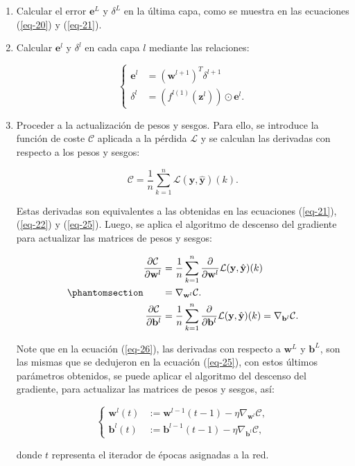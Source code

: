 \documentclass[
  us-letterpaper,
]{scrreprt}
\theoremstyle{plain}
\theoremstyle{definition}
\theoremstyle{definition}
\theoremstyle{plain}
\theoremstyle{remark}
\begin{document}
\begin{enumerate}
\def\labelenumi{\arabic{enumi}.}
\item
  Calcular el error \(\mathbf e^L\) y \(\delta^L\) en la última capa,
  como se muestra en las ecuaciones (\ref{eq-20}) y (\ref{eq-21}).
\item
  Calcular \(\mathbf e^l\) y \(\delta^l\) en cada capa \(l\) mediante
  las relaciones:

  \[
  \begin{cases}\mathbf e^l&= (\mathbf w^{l+1})^T\delta^{l+1}\\ \delta^l &= (f^{l(1)}(\mathbf z^l))\odot \mathbf e^l.\end{cases}
  \]
\item
  Proceder a la actualización de pesos y sesgos. Para ello, se introduce
  la función de coste \(\mathcal C\) aplicada a la pérdida
  \(\mathcal L\) y se calculan las derivadas con respecto a los pesos y
  sesgos:

  \[
  \mathcal C=\frac{1}{n}\sum_{k=1}^n \mathcal L(\mathbf y, \mathbf{\hat{y}})(k).
  \]

  Estas derivadas son equivalentes a las obtenidas en las ecuaciones
  (\ref{eq-21}), (\ref{eq-22}) y (\ref{eq-25}). Luego, se aplica el
  algoritmo de descenso del gradiente para actualizar las matrices de
  pesos y sesgos:

  \begin{equation}\phantomsection\label{eq-26}{
  \begin{split}\frac{\partial \mathcal C}{\partial \mathbf w^l}&=\frac{1}{n}\sum_{k=1}^n \frac{\partial}{\partial \mathbf w^l}\mathcal L(\mathbf y, \hat{\mathbf y})(k)\\ &=\nabla_{\mathbf w^l}\mathcal C.\\ 
  \frac{\partial\mathcal C}{\partial\mathbf b^l}&= \frac{1}{n}\sum_{k=1}^n \frac{\partial}{\partial \mathbf b^l}\mathcal L(\mathbf y, \hat{\mathbf y})(k)=\nabla_{\mathbf b^l}\mathcal C.\end{split}
  }\end{equation}

  Note que en la ecuación (\ref{eq-26}), las derivadas con respecto a
  \(\mathbf w^L\) y \(\mathbf b^L\), son las mismas que se dedujeron en
  la ecuación (\ref{eq-25}), con estos últimos parámetros obtenidos, se
  puede aplicar el algoritmo del descenso del gradiente, para actualizar
  las matrices de pesos y sesgos, así:

  \[
  \begin{cases}\mathbf w^l(t)&:= \mathbf w^{l-1}(t-1)-\eta\nabla_{\mathbf w^l}\mathcal C,\\ \mathbf b^l(t)&:= \mathbf b^{l-1}(t-1)-\eta\nabla_{\mathbf b^l}\mathcal C,\end{cases}
  \]

  donde \(t\) representa el iterador de épocas asignadas a la red.
\end{enumerate}
\end{document}
